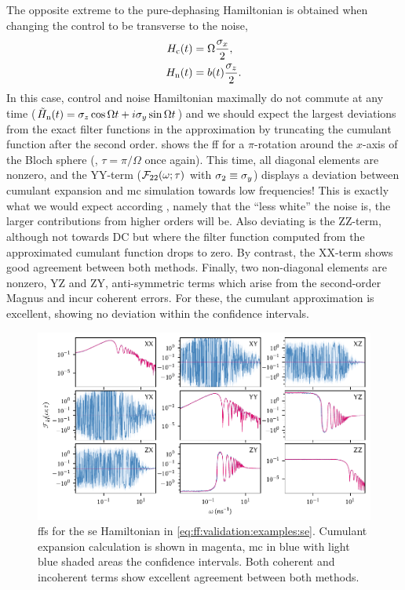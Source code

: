 The opposite extreme to the pure-dephasing Hamiltonian is obtained when changing the control to be transverse to the noise,
\begin{equation}\label{eq:ff:validation:examples:x}
    \begin{split}
        H_{\mathrm{c}}(t) &= \Omega\frac{\sigma_x}{2}, \\
        H_{\mathrm{n}}(t) &= b(t)\frac{\sigma_z}{2}.
    \end{split}
\end{equation}
In this case, control and noise Hamiltonian maximally do not commute at any time ($\tilde{H}_{\mathrm{n}}(t)=\sigma_z\cos\Omega t +i\sigma_y\sin\Omega t$) and we should expect the largest deviations from the exact filter functions in the approximation by truncating the cumulant function after the second order.
 shows the \gls{ff} for a $\pi$-rotation around the $x$-axis of the Bloch sphere (\ie, $\tau = \pi/\Omega$ once again).
This time, all diagonal elements are nonzero, and the YY-term ($\mathcal{F}_{22}(\omega;\tau)$ with $\sigma_2\equiv\sigma_y$) displays a deviation between cumulant expansion and \gls{mc} simulation towards low frequencies!
This is exactly what we would expect according \citet{Fox1976}, namely that the \enquote{less white} the noise is, the larger contributions from higher orders will be.
Also deviating is the ZZ-term, although not towards DC but where the filter function computed from the approximated cumulant function drops to zero.
By contrast, the XX-term shows good agreement between both methods.
Finally, two non-diagonal elements are nonzero, YZ and ZY, anti-symmetric terms which arise from the second-order Magnus and incur coherent errors.
For these, the cumulant approximation is excellent, showing no deviation within the confidence intervals.

\begin{figure}
    \centering
    \includegraphics{img/pdf/filter_functions/monte_carlo_FF_spin_echo}
    \caption[]{
        \Glspl{ff} for the \gls{se} Hamiltonian in \cref{eq:ff:validation:examples:se}.
        Cumulant expansion calculation is shown in magenta, \gls{mc} in blue with light blue shaded areas the confidence intervals.
        Both coherent and incoherent terms show excellent agreement between both methods.
    }
    \label{fig:ff:monte_carlo:se}
\end{figure}


